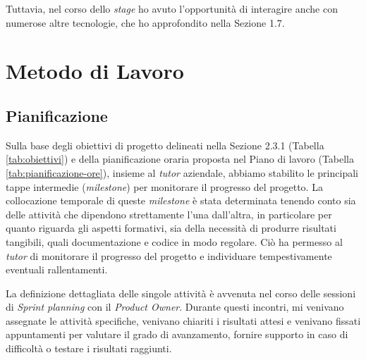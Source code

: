         \noindent Tuttavia, nel corso dello \textit{stage} ho avuto l’opportunità di interagire anche con numerose altre tecnologie, che ho approfondito nella Sezione 1.7.

    \section{Metodo di Lavoro}
        \subsection{Pianificazione}
        
        Sulla base degli obiettivi di progetto delineati nella Sezione 2.3.1 (Tabella \ref{tab:obiettivi}) e della pianificazione oraria proposta nel Piano di lavoro (Tabella \ref{tab:pianificazione-ore}), insieme al \textit{tutor} aziendale, abbiamo stabilito le principali tappe intermedie (\textit{milestone}) per monitorare il progresso del progetto. La collocazione temporale di queste \textit{milestone} è stata determinata tenendo conto sia delle attività che dipendono strettamente l'una dall'altra, in particolare per quanto riguarda gli aspetti formativi, sia della necessità di produrre risultati tangibili, quali documentazione e codice in modo regolare. Ciò ha permesso al \textit{tutor} di monitorare il progresso del progetto e individuare tempestivamente eventuali rallentamenti.

        \vspace{0.2 em}
        \noindent La definizione dettagliata delle singole attività è avvenuta nel corso delle sessioni di \textit{Sprint planning} con il \textit{Product Owner}. Durante questi incontri, mi venivano assegnate le attività specifiche, venivano chiariti i risultati attesi e venivano fissati appuntamenti per valutare il grado di avanzamento, fornire supporto in caso di difficoltà o testare i risultati raggiunti. 

        \renewcommand{\arraystretch}{2} %
        \setlength{\tabcolsep}{9pt} %
        
